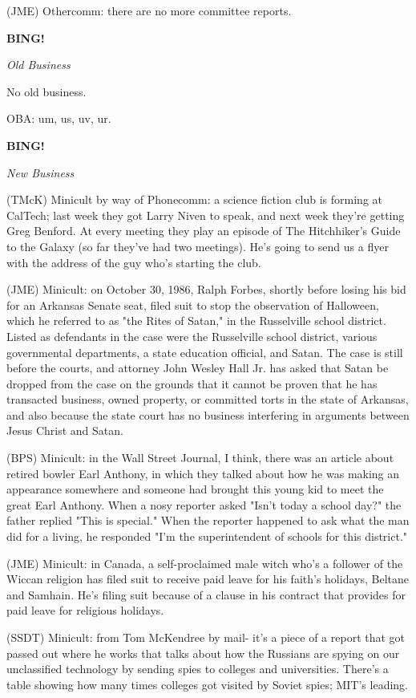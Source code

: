 \documentclass[12pt]{article}
\newcommand{\bing}{{\bf BING!} }
\newcommand{\goto}[1]{\bing \vskip 12pt \centerline{{\em{#1}}}}
\begin{document}
(JME) Othercomm: there are no more committee reports.

\goto{Old Business}

No old business.

OBA: um, us, uv, ur.

\goto{New Business}

(TMcK) Minicult by way of Phonecomm: a science fiction club is forming at CalTech; last week they got Larry Niven to speak, and next week they're getting Greg Benford. At every meeting they play an episode of The Hitchhiker's Guide to the Galaxy (so far they've had two meetings). He's going to send us a flyer with the address of the guy who's starting the club.

(JME) Minicult: on October 30, 1986, Ralph Forbes, shortly before losing his bid for an Arkansas Senate seat, filed suit to stop the observation of Halloween, which he referred to as "the Rites of Satan," in the Russelville school district. Listed as defendants in the case were the Russelville school district, various governmental departments, a state education official, and Satan. The case is still before the courts, and attorney John Wesley Hall Jr. has asked that Satan be dropped from the case on the grounds that it cannot be proven that he has transacted business, owned property, or committed torts in the state of Arkansas, and also because the state court has no business interfering in arguments between Jesus Christ and Satan.

(BPS) Minicult: in the Wall Street Journal, I think, there was an article about retired bowler Earl Anthony, in which they talked about how he was making an appearance somewhere and someone had brought this young kid to meet the great Earl Anthony. When a nosy reporter asked "Isn't today a school day?" the father replied "This is special." When the reporter happened to ask what the man did for a living, he responded "I'm the superintendent of schools for this district."

(JME) Minicult: in Canada, a self-proclaimed male witch who's a follower of the Wiccan religion has filed suit to receive paid leave for his faith's holidays, Beltane and Samhain. He's filing suit because of a clause in his contract that provides for paid leave for religious holidays.

(SSDT) Minicult: from Tom McKendree by mail- it's a piece of a report that got passed out where he works that talks about how the Russians are spying on our unclassified technology by sending spies to colleges and universities. There's a table showing how many times colleges got visited by Soviet spies; MIT's leading.
\end{document}
